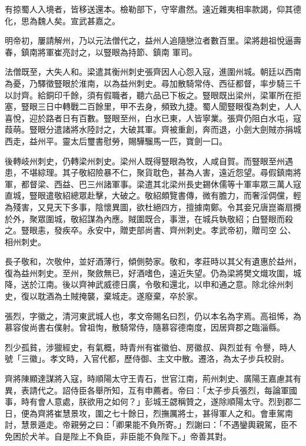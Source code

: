 \begin{pinyinscope}
 有掠蜀人入境者，皆移送還本。檢勒部下，守宰肅然。遠近雜夷相率款謁，仰其德化，思為魏人矣。宣武甚嘉之。



 明帝初，屢請解州，乃以元法僧代之，益州人追隨戀泣者數百里。梁將趙祖悅逼壽春，鎮南將軍崔亮討之，以豎眼為持節、鎮南
 軍司。



 法僧既至，大失人和。梁遣其衡州刺史張齊因人心怨入寇，進圍州城。朝廷以西南為憂，乃驛徵豎眼於淮南，以為益州刺史。尋加散騎常侍、西征都督，率步騎三千以討齊。給銅印千餘，須有假職者，聽六品已下板之。豎眼既出梁州，梁軍所在拒塞，豎眼三日中轉戰二百餘里，甲不去身，頻致九捷。蜀人聞豎眼復為刺史，人人喜悅，迎於路者日有百數。豎眼至州，白水已東，人皆寧業。張齊仍阻白水屯，寇葭萌。豎眼分遣諸將水陸討之，大破其軍。齊被重創，奔而退，小劍大劍賊亦捐城西走，益州平。靈太后璽書慰勞，賜驊騮馬一匹，寶劍一口。



 後轉岐州刺史，仍轉梁州刺史。梁州人既得豎眼為牧，人咸自賀。而豎眼至州遇患，不堪綜理。其子敬紹險暴不仁，聚貨耽色，甚為人害，遠近怨望。尋假鎮南將軍，都督梁、西益、巴三州諸軍事。梁遣其北梁州長史錫休儒等十軍率眾三萬人寇直城，豎眼遣敬紹總眾赴擊，大破之。敬紹頗覽書傳，微有膽力，而奢淫倜儻，輕為殘害，又見天下多事，陰懷異圖，欲杜絕四方，擅據南鄭。令其妾兄唐崑崙扇攪於外，聚眾圍城，敬紹謀為內應。賊圍既合，事泄，在城兵執敬紹；白豎眼而殺之。豎眼恚，發疾卒。永安中，贈吏部尚書、齊州刺史。孝武帝初，贈司空
 公、相州刺史。



 長子敬和，次敬仲，並好酒薄行，傾側勢家。敬和，孝莊時以其父有遺惠於益州，復為益州刺史。至州，聚斂無已，好酒嗜色，遠近失望。仍為梁將樊文熾攻圍，城降，送於江南。後以齊神武威德日廣，令敬和還北，以申和通之意。除北徐州刺史，復以耽酒為土賊掩襲，棄城走。遂廢棄，卒於家。



 張烈，字徽之，清河東武城人也，孝文帝賜名曰烈，仍以本名為字焉。高祖悕，為慕容俊尚書右僕射。曾祖恂，散騎常侍，隨慕容德南度，因居齊郡之臨淄縣。



 烈少孤貧，涉獵經史，有氣概，時青州有崔徽伯、房徽叔、與烈並有
 令譽，時人號「三徽」。孝文時，入官代都，歷侍御、主文中散。遷洛，為太子步兵校尉。



 齊將陳顯達謀將入寇，時順陽太守王青石，世官江南，荊州刺史、廣陽王嘉慮其有異，表請代之。詔侍臣各舉所知，互有申薦者。帝曰：「太子步兵張烈，每論軍國事，時有會人意處，朕欲用之如何？」彭城王勰稱贊之，遂除順陽太守。烈到郡二日，便為齊將崔慧景攻，圍之七十餘日，烈撫厲將士，甚得軍人之和。會車駕南討，慧景遁走。帝親勞之曰：「卿果能不負所寄。」烈謝曰：「不遇鑾輿親駕，臣不免困於犬羊。自是陛上不負臣，非臣能不負陛下。」帝善其對。




\end{pinyinscope}
